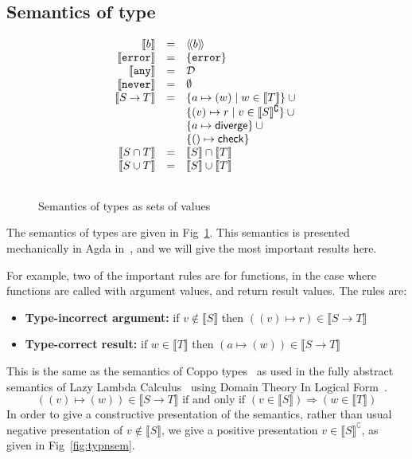 \documentclass[acmsmall,review,screen]{acmart}
\newcommand{\NEVER}{\mathtt{never}}
\newcommand{\ANY}{\mathtt{any}}
\newcommand{\ERROR}{\mathtt{error}}
\newcommand{\DIVERGE}{\mathsf{diverge}}
\newcommand{\CHECK}{\mathsf{check}}
\newcommand{\fun}{\mathbin{\rightarrow}}
\newcommand{\sem}[1]{\llbracket{#1}\rrbracket}
\newcommand{\ssem}[1]{\langle\!\langle{#1}\rangle\!\rangle}
\newcommand{\nsem}[1]{\llbracket{#1}\rrbracket^\complement}
\begin{document}
\subsection{Semantics of  type}

\begin{figure}
  
\[\begin{array}{rcl}
  \sem{b} & = & \ssem{b} \\
  \sem{\ERROR} & = & \{ \ERROR \} \\
  \sem{\ANY} & = & \mathcal{D} \\
  \sem{\NEVER} & = & \emptyset \\
  \sem{S \fun T} & = & \{ a \mapsto (w) \mid w \in \sem{T} \} \cup {} \\
                    && \{ (v) \mapsto r \mid v \in \nsem{S} \} \cup {} \\
                    && \{ a \mapsto \DIVERGE \} \cup {} \\
                    && \{ () \mapsto \CHECK \} \\
  \sem{S \cap T} & = & \sem{S} \cap \sem{T} \\
  \sem{S \cup T} & = & \sem{S} \cup \sem{T} \\[\bigskipamount]
\end{array}\]
\caption{Semantics of types as sets of values}
\label{fig:typsem}

\end{figure}


The semantics of  types are given in Fig~\ref{fig:typsem}.
This semantics is presented mechanically in Agda in~,
and we will give the most important results here.

For example, two of the important rules are for functions, in the case where
functions are called with argument values, and return result values.
The rules are:

\begin{itemize}
\item
  \textbf{Type-incorrect argument:}
  if $v \not\in \sem{S}$
  then $((v) \mapsto r) \in \sem{S \fun T}$
\item
  \textbf{Type-correct result:}
  if $w \in \sem{T}$
  then $(a \mapsto (w)) \in \sem{S \fun T}$
\end{itemize}
This is the same as the semantics of Coppo types~\cite{???}
as used in the fully abstract semantics of Lazy Lambda Calculus~\cite{???}
using Domain Theory In Logical Form~\cite{???}.
\[
  ((v) \mapsto (w)) \in \sem{S \fun T} \mbox{ if and only if }
  (v \in \sem{S}) \Rightarrow (w \in \sem{T})
\]
In order to give a constructive presentation of the semantics,
rather than usual negative presentation of $v \not\in \sem{S}$,
we give a positive presentation $v \in \nsem{S}$, as given in
Fig~\ref{fig:typnsem}.
\end{document}
